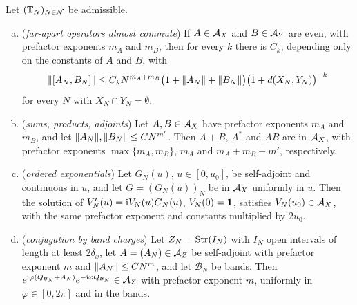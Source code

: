 \begin{lemma}\label{lem:calculus}
Let $(\mathbb{T}_N)_{N\in\mathcal N}$ be admissible.
\begin{enumerate}[(a)]
\item (\emph{far-apart operators almost commute}) If $A\in\mathcal{A}_X$ and $B\in\mathcal{A}_Y$ are even, with prefactor
exponents $m_A$ and $m_B$, then for every $k$ there is $C_k$, depending only on the constants of $A$ and $B$, with
\[
\lVert[A_N,B_N]\rVert\le C_kN^{m_A+m_B}\bigl(1+\lVert A_N\rVert+\lVert B_N\rVert\bigr)\bigl(1+d(X_N,Y_N)\bigr)^{-k}
\]
for every $N$ with $X_N\cap Y_N=\emptyset$.
\item (\emph{sums, products, adjoints}) Let $A,B\in\mathcal{A}_X$ have prefactor exponents $m_A$ and $m_B$, and let
$\lVert A_N\rVert,\lVert B_N\rVert\le CN^{m'}$. Then $A+B$, $A^*$ and $AB$ are in $\mathcal{A}_X$, with prefactor exponents
$\max\{m_A,m_B\}$, $m_A$ and $m_A+m_B+m'$, respectively.
\item (\emph{ordered exponentials}) Let $G_N(u)$, $u\in[0,u_0]$, be self-adjoint and continuous in $u$, and let
$G=(G_N(u))_N$ be in $\mathcal{A}_X$ uniformly in $u$. Then the solution of $V_N'(u)=\mathrm{i} V_N(u)G_N(u)$, $V_N(0)=\mathbf{1}$, satisfies $V_N(u_0)\in\mathcal{A}_X$, with the
same prefactor exponent and constants multiplied by $2u_0$.
\item (\emph{conjugation by band charges}) Let $Z_N=\mathrm{Str}(I_N)$ with $I_N$ open intervals of length at least
$2\delta_x$, let $A=(A_N)\in\mathcal{A}_Z$ be self-adjoint with prefactor exponent $m$ and $\lVert A_N\rVert\le CN^m$, and let
$\mathcal B_N$ be bands. Then $e^{\mathrm{i}\varphi(Q_{\mathcal B_N}+A_N)}e^{-\mathrm{i}\varphi Q_{\mathcal B_N}}\in\mathcal{A}_Z$ with prefactor
exponent $m$, uniformly in $\varphi\in[0,2\pi]$ and in the bands.
\end{enumerate}
\end{lemma}

